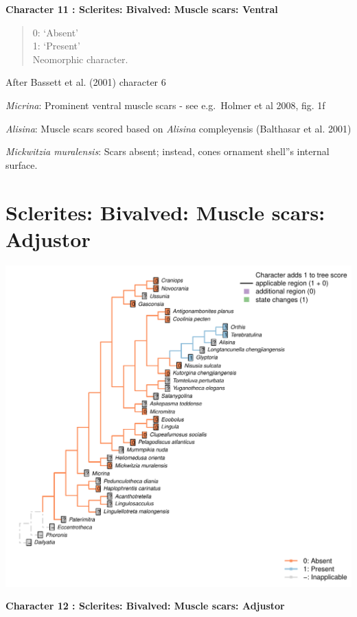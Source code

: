 \documentclass[]{book}
\theoremstyle{definition}
\theoremstyle{definition}
\theoremstyle{definition}
\theoremstyle{remark}
\begin{document}
\textbf{Character 11 : Sclerites: Bivalved: Muscle scars: Ventral }

\begin{quote}
0: `Absent'\\
1: `Present'\\
Neomorphic character.
\end{quote}

After Bassett et al. (2001) character 6

\emph{Micrina}: Prominent ventral muscle scars - see e.g.~Holmer et al
2008, fig. 1f

\emph{Alisina}: Muscle scars scored based on \emph{Alisina} compleyensis
(Balthasar et al. 2001)

\emph{Mickwitzia muralensis}: Scars absent; instead, cones ornament
shell''s internal surface.

\hypertarget{sclerites-bivalved-muscle-scars-adjustor}{%
\section*{Sclerites: Bivalved: Muscle scars:
Adjustor}\label{sclerites-bivalved-muscle-scars-adjustor}}

\includegraphics{Brachiopod_phylogeny_files/figure-latex/unnamed-chunk-5-12.pdf}

\textbf{Character 12 : Sclerites: Bivalved: Muscle scars: Adjustor }
\end{document}
